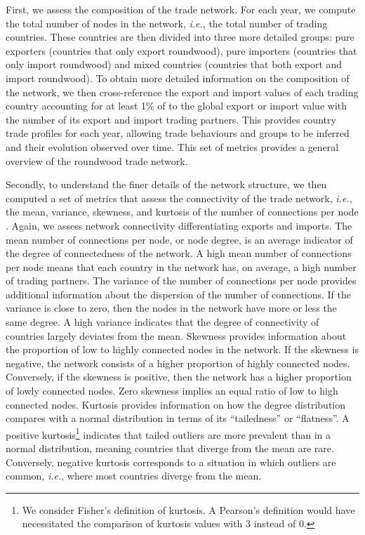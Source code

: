 \documentclass[
  authoryear,
  review,
  3p]{elsarticle}
\begin{document}
First, we assess the composition of the trade network. For each year, we
compute the total number of nodes in the network, \emph{i.e.}, the total
number of trading countries. These countries are then divided into three
more detailed groups: pure exporters (countries that only export
roundwood), pure importers (countries that only import roundwood) and
mixed countries (countries that both export and import roundwood). To
obtain more detailed information on the composition of the network, we
then cross-reference the export and import values of each trading
country accounting for at least 1\% of to the global export or import
value with the number of its export and import trading partners. This
provides country trade profiles for each year, allowing trade behaviours
and groups to be inferred and their evolution observed over time. This
set of metrics provides a general overview of the roundwood trade
network.

Secondly, to understand the finer details of the network structure, we
then computed a set of metrics that assess the connectivity of the trade
network, \emph{i.e.}, the mean, variance, skewness, and kurtosis of the
number of connections per node
\citep{albert2002statistical, newman2003structure}. Again, we assess
network connectivity differentiating exports and imports. The mean
number of connections per node, or node degree, is an average indicator
of the degree of connectedness of the network. A high mean number of
connections per node means that each country in the network has, on
average, a high number of trading partners. The variance of the number
of connections per node provides additional information about the
dispersion of the number of connections. If the variance is close to
zero, then the nodes in the network have more or less the same degree. A
high variance indicates that the degree of connectivity of countries
largely deviates from the mean. Skewness provides information about the
proportion of low to highly connected nodes in the network. If the
skewness is negative, the network consists of a higher proportion of
highly connected nodes. Conversely, if the skewness is positive, then
the network has a higher proportion of lowly connected nodes. Zero
skewness implies an equal ratio of low to high connected nodes. Kurtosis
provides information on how the degree distribution compares with a
normal distribution in terms of its ``tailedness'' or ``flatness''. A
positive kurtosis\footnote{We consider Fisher's definition of kurtosis.
  A Pearson's definition would have necessitated the comparison of
  kurtosis values with 3 instead of 0.} indicates that tailed outliers
are more prevalent than in a normal distribution, meaning countries that
diverge from the mean are rare. Conversely, negative kurtosis
corresponds to a situation in which outliers are common, \emph{i.e.},
where most countries diverge from the mean.
\end{document}
